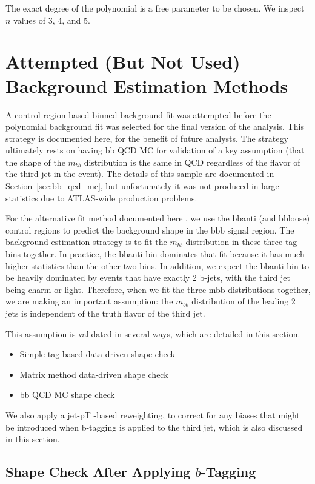 The exact degree of the polynomial is a free parameter to be chosen.  We inspect $n$ values
of 3, 4, and 5.  


\section{Attempted (But Not Used) Background Estimation Methods}
 
A control-region-based binned background fit was attempted before the polynomial background fit was selected
for the final version of the analysis.  This strategy is documented here, for the
benefit of future analysts.  The strategy ultimately rests on having bb QCD MC for validation
of a key assumption (that the shape of the $m_{bb}$ distribution is the same in QCD 
regardless of the flavor of the third jet in the event).  The details of this sample
are documented in Section~\ref{sec:bb_qcd_mc}, but unfortunately it was not produced in
large statistics due to ATLAS-wide production problems.   

For the alternative fit method documented here , we use the bbanti (and bbloose) control regions to predict the background shape in the bbb signal region.
The background estimation strategy is to fit the $m_{bb}$ distribution in these three tag bins together. In
 practice, the bbanti bin dominates that fit because it has much higher statistics than the other two bins. In
 addition, we expect the bbanti bin to be heavily dominated by events that have exactly 2 b-jets, with the
 third jet being charm or light. Therefore, when we fit the three mbb distributions together, we are making
 an important assumption: the $m_{bb}$ distribution of the leading 2 jets is independent of the truth flavor of the third jet.

This assumption is validated in several ways, which are detailed in this section.
\begin{itemize}
    \item Simple tag-based data-driven shape check
    \item Matrix method data-driven shape check
    \item bb QCD MC shape check
\end{itemize}
 We also apply a jet-pT -based reweighting, to correct for any biases that might be introduced when
 b-tagging is applied to the third jet, which is also discussed in this section.


\subsection{Shape Check After Applying $b$-Tagging}
